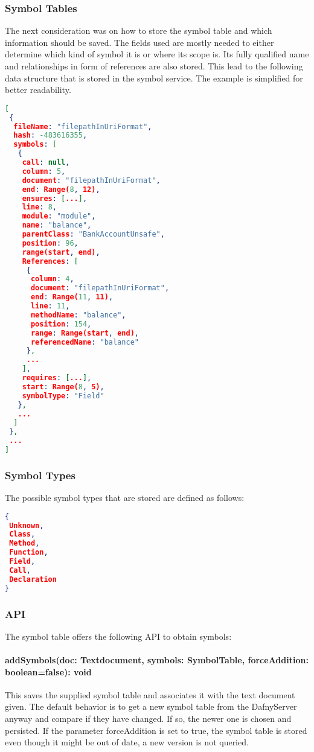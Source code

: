 \subsubsection{Symbol Tables}
The next consideration was on how to store the symbol table and which information should be saved. The fields used are mostly needed to either determine which kind of symbol it is or where its scope is. Its fully qualified name and relationships in form of references are also stored. This lead to the following data structure that is stored in the symbol service. The example is simplified for better readability.
\begin{lstlisting}[language=json,firstnumber=1]
[
 {
  fileName: "filepathInUriFormat",
  hash: -483616355,
  symbols: [
   {
    call: null,
    column: 5,
    document: "filepathInUriFormat",
    end: Range(8, 12),
    ensures: [...],
    line: 8,
    module: "module",
    name: "balance",
    parentClass: "BankAccountUnsafe",
    position: 96,
    range(start, end),
    References: [
     {
      column: 4,
      document: "filepathInUriFormat",
      end: Range(11, 11),
      line: 11,
      methodName: "balance",
      position: 154,
      range: Range(start, end),
      referencedName: "balance"
     },
     ...
    ],
    requires: [...],
    start: Range(8, 5),
    symbolType: "Field"
   },
   ...
  ]
 },
 ...
]
\end{lstlisting}
\subsubsection{Symbol Types}
The possible symbol types that are stored are defined as follows:
\begin{lstlisting}[language=json,firstnumber=1]
{
 Unknown,
 Class,
 Method,
 Function,
 Field,
 Call,
 Declaration	
}

\end{lstlisting}
\subsubsection{API}
The symbol table offers the following API to obtain symbols:
\paragraph{addSymbols(doc: Textdocument, symbols: SymbolTable, forceAddition: boolean=false): void} This saves the supplied symbol table and associates it with the text document given. The default behavior is to get a new symbol table from the DafnyServer anyway and compare if they have changed. If so, the newer one is chosen and persisted. If the parameter forceAddition is set to true, the symbol table is stored even though it might be out of date, a new version is not queried.
